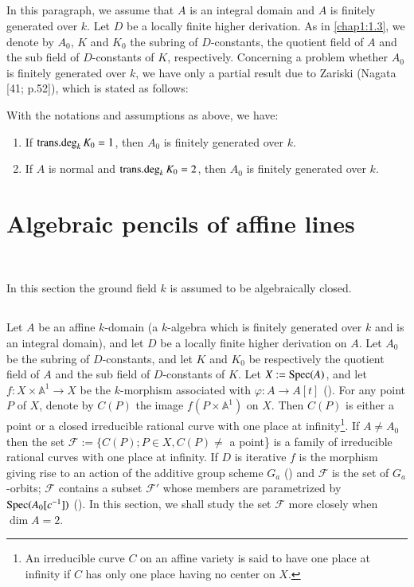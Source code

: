 \subsection{}\label{chap1:1.6}
In this paragraph, we assume that $A$ is an integral domain and $A$ is
finitely generated over $k$. Let $D$ be a locally finite higher
derivation. As in \ref{chap1:1.3}, we denote by $A_{0}$, $K$ and $K_{0}$ the
subring of $D$-constants, the quotient field of $A$ and the sub field
of $D$-constants of $K$, respectively. Concerning a problem whether
$A_{0}$ is finitely generated over $k$, we have only a partial result
due to Zariski (\cf Nagata [41; p.52]), which is stated as follows:

\begin{lemma*}
  With the notations and assumptions as above, we have:
  \begin{enumerate}
    \renewcommand{\labelenumi}{\rm(\theenumi)}
  \item If $\operatorname{trans{.}deg}_{k}K_{0}=1$, then $A_{0}$ is finitely
    generated over $k$.
    
  \item If $A$ is normal and $\operatorname{trans{.}deg}_{k}K_{0}=2$, then
    $A_{0}$ is finitely generated over $k$.
  \end{enumerate}
\end{lemma*}

\section{Algebraic pencils of affine lines}\label{chap1:sec2}\pageoriginale\

In this section the ground field $k$ is assumed to be algebraically
closed.

\subsection{}\label{chap1:2.1}
Let $A$ be an affine $k$-domain (\iec a $k$-algebra which is finitely
generated over $k$ and is an integral domain), and let $D$ be a
locally finite higher derivation on $A$. Let $A_{0}$ be the subring of
$D$-constants, and let $K$ and $K_{0}$ be respectively the quotient
field of $A$ and the sub field of $D$-constants of $K$. Let
$X:=\operatorname{Spec}(A)$, and let $f:X\times \mathbb{A}^{1}\to X$ be the
$k$-morphism associated with $\varphi:A\to A[t]$ (). For any
point $P$ of $X$, denote by $C(P)$ the image $f(P\times
\mathbb{A}^{1})$ on $X$. Then $C(P)$ is either a point or a closed
irreducible rational curve with one place at infinity\footnote[1]{An
  irreducible curve $C$ on an affine variety is said to have one place
at infinity if $C$ has only one place having no center on $X$.}. If
$A\neq A_{0}$ then the set $\mathscr{F}:=\{C(P);P\in X,C(P)\neq$ a
point\} is a family of irreducible rational curves with one place at
infinity. If $D$ is iterative $f$ is the morphism giving rise to an
action of the additive group scheme $G_{a}$ () and
$\mathscr{F}$ is the set of $G_{a}$-orbits; $\mathscr{F}$ contains a
subset $\mathscr{F}'$ whose members are parametrized by
$\operatorname{Spec}(A_{0}[c^{-1}])$ (). In this section, we shall study the
set $\mathscr{F}$ more closely when $\dim A=2$. 


